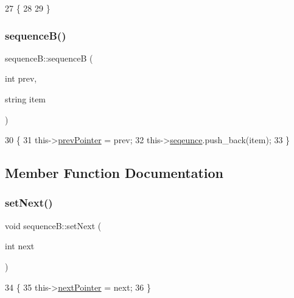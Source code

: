 \begin{DoxyCode}
27                 \{
28 
29     \}
\end{DoxyCode}
\mbox{\label{structsequence_b_afbfeeebc82d4d3ad4807bae870a8e13a}} 
\subsubsection{\texorpdfstring{sequence\+B()}{sequenceB()}\hspace{0.1cm}{\footnotesize\ttfamily [2/2]}}
{\footnotesize\ttfamily sequence\+B\+::sequenceB (\begin{DoxyParamCaption}\item[{int}]{prev,  }\item[{string}]{item }\end{DoxyParamCaption})\hspace{0.3cm}{\ttfamily [inline]}}


\begin{DoxyCode}
30                                     \{
31         this->\mbox{\hyperlink{structsequence_b_a283d04c17687640e735e6fc5dc444f50}{prevPointer}} = prev;
32         this->\mbox{\hyperlink{structsequence_b_a4cb5526b3901d3a3348447bee4e7f623}{seqeunce}}.push\_back(item);
33     \}
\end{DoxyCode}


\subsection{Member Function Documentation}
\mbox{\label{structsequence_b_aaf3c661c2c5c00029eb796b2a0a7ca6c}} 
\subsubsection{\texorpdfstring{set\+Next()}{setNext()}}
{\footnotesize\ttfamily void sequence\+B\+::set\+Next (\begin{DoxyParamCaption}\item[{int}]{next }\end{DoxyParamCaption})\hspace{0.3cm}{\ttfamily [inline]}}


\begin{DoxyCode}
34                           \{
35         this->\mbox{\hyperlink{structsequence_b_a7fc2afa4a31d852ecaae7d0b6733ad7e}{nextPointer}} = next;
36     \}
\end{DoxyCode}
\mbox{\label{structsequence_b_a4ac2a92234d1686dc5cbbaf9ebc1d304}} 
